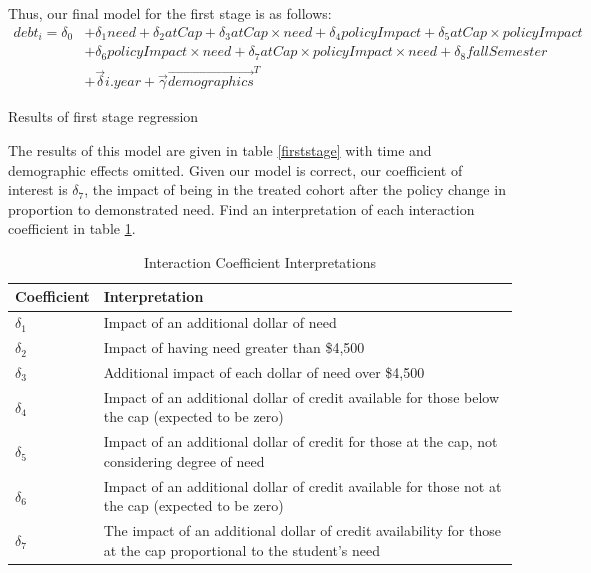 \documentclass{article}
\newcommand{\regs}{../Analysis/Regressions/Output/}
\begin{document}
	Thus, our final model for the first stage is as follows: 
	\begin{align*}
	debt_i = \delta_0 &+ \delta_1 need + \delta_2 atCap + \delta_3 atCap \times need + \delta_4 policyImpact + \delta_5 atCap \times policyImpact\\
	 &+ \delta_6 policyImpact \times need + \delta_7 atCap \times policyImpact \times need + \delta_8 fallSemester \\
	 &+ \vec{\delta} i.year + \vec{\gamma} \vec{demographics}^T
	 \end{align*} 
	 
	 \begin{table}
	 	\centering
	 	
	 	
	 	
	 	\caption{Results of first stage regression}
	 	\label{firststage}
	 \end{table}
	 
	 The results of this model are given in table \ref{firststage} with time and demographic effects omitted. Given our model is correct, our coefficient of interest is $\delta_7$, the impact of being in the treated cohort after the policy change in proportion to demonstrated need. Find an interpretation of each interaction coefficient in table \ref{coefInterp}.
	
	\begin{table}
		\centering
		
		\begin{tabular}{lp{8cm}}
			\toprule
			Coefficient & Interpretation\\
			\midrule
			$\delta_1$ & Impact of an additional dollar of need\\
			$\delta_2$ & Impact of having need greater than \$4,500 \\
			$\delta_3$ & Additional impact of each dollar of need over \$4,500 \\
			$\delta_4$ & Impact of an additional dollar of credit available for those below the cap (expected to be zero)\\
			$\delta_5$ & Impact of an additional dollar of credit for those at the cap, not considering degree of need\\
			$\delta_6$ & Impact of an additional dollar of credit available for those not at the cap (expected to be zero)\\
			$\delta_7$ & The impact of an additional dollar of credit availability for those at the cap proportional to the student's need \\
			\bottomrule
		\end{tabular}
	
	\caption{Interaction Coefficient Interpretations}
	\label{coefInterp}
	\end{table}
	
\end{document}
